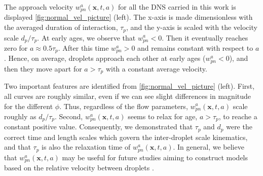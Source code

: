 The approach velocity $w_{pn}^a(\textbf{x},t,a)$ for all the DNS carried in this work is displayed \ref{fig:normal_vel_picture} (left). 
The x-axis is made dimensionless with the averaged duration of interaction, $\tau_p$, and the y-axis is scaled with the velocity scale $d_p /\tau_p$. 
At early ages, we observe that $w_{pn}^a<0$.
Then it eventually reaches zero for  $a \approx 0.5\tau_p$.
After this time $w_{pn}^a>0$ and remains constant with respect to $a$. 
Hence, on average, droplets approach each other at early ages ($w_{pn}^a<0$), and then they move apart for $a > \tau_p$ with a constant average velocity.

Two important features are identified from \ref{fig:normal_vel_picture} (left).
First, all curves are roughly similar, even if we can see slight differences in magnitude for the different $\phi$. 
Thus, regardless of the flow parameters, $w_{pn}^a(\textbf{x},t,a)$ scale roughly as $d_p /\tau_p$. 
Second,  $w_{pn}^a(\textbf{x},t,a)$ seems to relax for age, $a > \tau_p$, to reache a constant positive value. 
Consequently, we demonstrated that $\tau_p$ and $d_p$ were the correct time and length scales which govern the inter-droplet scale kinematics, and that $\tau_p$ is also the relaxation time of $w_{pn}^a(\textbf{x},t,a)$. 
In general, we believe that $w_{pn}^a(\textbf{x},t,a)$ may be useful for future studies aiming to construct models based on the relative velocity between droplets \citep{rao2008introduction}. 


